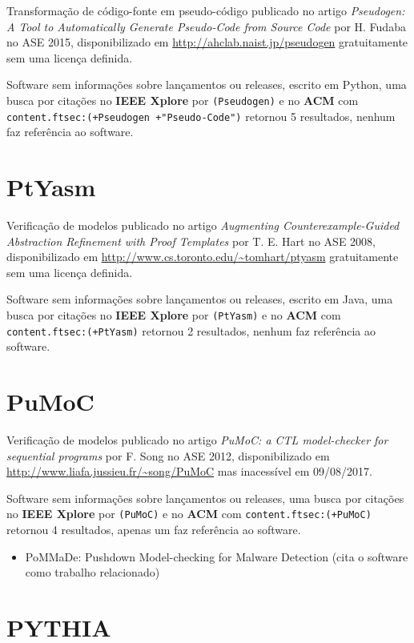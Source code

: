 Transformação de código-fonte em pseudo-código
publicado no artigo {\it Pseudogen: A Tool to Automatically Generate Pseudo-Code from Source Code}
por H. Fudaba
no ASE 2015,
disponibilizado em \url{http://ahclab.naist.jp/pseudogen}
gratuitamente
sem uma licença definida.

Software sem informações sobre lançamentos ou releases,
escrito em Python,
uma busca por citações no {\bf IEEE Xplore} por
\texttt{(Pseudogen)}
e no {\bf ACM} com
\texttt{content.ftsec:(+Pseudogen +"Pseudo-Code")}
retornou
5 resultados,
nenhum faz referência ao software.


\section{PtYasm}

Verificação de modelos
publicado no artigo {\it Augmenting Counterexample-Guided Abstraction Refinement with Proof Templates}
por T. E. Hart
no ASE 2008,
disponibilizado em \url{http://www.cs.toronto.edu/~tomhart/ptyasm}
gratuitamente
sem uma licença definida.

Software sem informações sobre lançamentos ou releases,
escrito em Java,
uma busca por citações no {\bf IEEE Xplore} por
\texttt{(PtYasm)}
e no {\bf ACM} com
\texttt{content.ftsec:(+PtYasm)}
retornou
2 resultados,
nenhum faz referência ao software.


\section{PuMoC}

Verificação de modelos
publicado no artigo {\it PuMoC: a CTL model-checker for sequential programs}
por F. Song
no ASE 2012,
disponibilizado em \url{http://www.liafa.jussieu.fr/~song/PuMoC}
mas inacessível em 09/08/2017.

Software sem informações sobre lançamentos ou releases,
uma busca por citações no {\bf IEEE Xplore} por
\texttt{(PuMoC)}
e no {\bf ACM} com
\texttt{content.ftsec:(+PuMoC)}
retornou
4 resultados,
apenas um faz referência ao software.

\begin{itemize}
\item PoMMaDe: Pushdown Model-checking for Malware Detection (cita o software como trabalho relacionado)
\end{itemize}

\section{PYTHIA}

